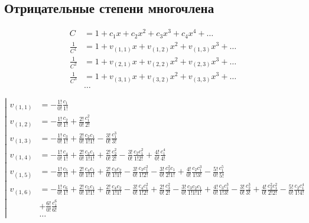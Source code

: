 \subsection{Отрицательные степени многочлена}

\begin{equation*}
\begin{aligned}
C &= 1 + c_1 x + c_2 x^2 + c_3 x^3 + c_4 x^4 + \ldots \\
\frac{1}{C^1} &= 1 + v_{(1,1)} x + v_{(1,2)} x^2 + v_{(1,3)} x^3 + \ldots 	\\ 
\frac{1}{C^2} &= 1 + v_{(2,1)} x + v_{(2,2)} x^2 + v_{(2,3)} x^3 + \ldots 	\\
\frac{1}{C^3} &= 1 + v_{(3,1)} x + v_{(3,2)} x^2 + v_{(3,3)} x^3 + \ldots 	\\ 
&\dots
\end{aligned}
\end{equation*}

\begin{equation*}
\left|
\begin{aligned}
v_{(1,1)} 
&= 
- \frac{1!}{0!} \frac{c_1}{1!} \\ 
v_{(1,2)} 
&= 
- \frac{1!}{0!} \frac{c_2}{1!} 
+ \frac{2!}{0!} \frac{c_1^2}{2!} \\
v_{(1,3)} 
&= 
- \frac{1!}{0!} \frac{c_3}{1!} 
+ \frac{2!}{0!} \frac{c_2 c_1}{1!1!} 
- \frac{3!}{0!} \frac{c_1^3}{3!} \\
v_{(1,4)}
&= 
- \frac{1!}{0!} \frac{c_4}{1!} 
+ \frac{2!}{0!} \frac{c_3 c_1}{1!1!} 
+ \frac{2!}{0!} \frac{c_2^2}{2!}
- \frac{3!}{0!} \frac{c_2 c_1^2}{1!2!}
+ \frac{4!}{0!} \frac{c_1^4}{4!} \\
v_{(1,5)}
&=
- \frac{1!}{0!} \frac{c_5}{1!} 
+ \frac{2!}{0!} \frac{c_4 c_1}{1!1!} 
+ \frac{2!}{0!} \frac{c_3 c_2}{1!1!}
- \frac{3!}{0!} \frac{c_3 c_1^2}{1!2!}
- \frac{3!}{0!} \frac{c_2^2 c_1}{2!1!}
+ \frac{4!}{0!} \frac{c_2 c_1^3}{1!3!}
- \frac{5!}{0!} \frac{c_1^5}{5!} \\
v_{(1,6)}
&=
- \frac{1!}{0!} \frac{c_6}{1!} 
+ \frac{2!}{0!} \frac{c_5 c_1}{1!1!} 
+ \frac{2!}{0!} \frac{c_4 c_2}{1!1!}
- \frac{3!}{0!} \frac{c_4 c_1^2}{1!2!}
+ \frac{2!}{0!} \frac{c_3^2}{2!}
- \frac{3!}{0!} \frac{c_3 c_2 c_1}{1!1!1!}
+ \frac{4!}{0!} \frac{c_3 c_1^3}{1!3!}
- \frac{3!}{0!} \frac{c_2^3}{3!}
+ \frac{4!}{0!} \frac{c_2^2 c_1^2}{2!2!}
- \frac{5!}{0!} \frac{c_2 c_1^4}{1!4!} \\
&
+ \frac{6!}{0!} \frac{c_1^6}{6!} \\
&\ldots
\end{aligned}
\right.
\end{equation*}

